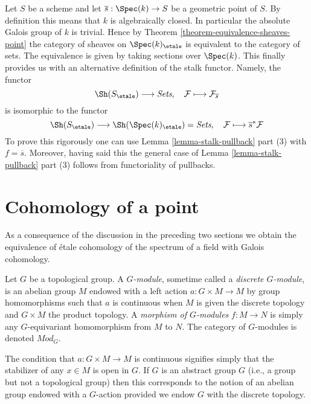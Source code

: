 \begin{remark}
\label{remark-stalk-pullback}
Let $S$ be a scheme and let $\overline{s} : \Spec(k) \to S$
be a geometric point of $S$. By definition this means that $k$
is algebraically closed. In particular the absolute Galois group of $k$
is trivial. Hence by
Theorem \ref{theorem-equivalence-sheaves-point}
the category of sheaves on $\Spec(k)_\etale$ is equivalent
to the category of sets. The equivalence is given by taking
sections over $\Spec(k)$. This finally provides us with an
alternative definition of the stalk functor. Namely, the functor
$$
\Sh(S_\etale) \longrightarrow \textit{Sets}, \quad
\mathcal{F} \longmapsto \mathcal{F}_{\overline{s}}
$$
is isomorphic to the functor
$$
\Sh(S_\etale)
\longrightarrow
\Sh(\Spec(k)_\etale) = \textit{Sets},
\quad
\mathcal{F} \longmapsto \overline{s}^*\mathcal{F}
$$
To prove this rigorously one can use
Lemma \ref{lemma-stalk-pullback} part (3)
with $f = \overline{s}$. Moreover, having said this the general case of
Lemma \ref{lemma-stalk-pullback} part (3)
follows from functoriality of pullbacks.
\end{remark}




\section{Cohomology of a point}
\label{section-cohomology-point}

\noindent
As a consequence of the discussion in the preceding two sections
we obtain the equivalence of \'etale cohomology of the spectrum of a
field with Galois cohomology.

\begin{definition}
\label{definition-G-module-continuous}
Let $G$ be a topological group.
A {\it $G$-module}, sometime called a {\it discrete $G$-module},
is an abelian group $M$ endowed with a left action $a : G \times M \to M$
by group homomorphisms such that $a$ is continuous when $M$ is given the
discrete topology and $G \times M$ the product topology.
A {\it morphism of $G$-modules} $f : M \to N$ is simply any $G$-equivariant
homomorphism from $M$ to $N$.
The category of $G$-modules is denoted {\it $\textit{Mod}_G$}.
\end{definition}

\noindent
The condition that $a : G \times M \to M$ is continuous signifies
simply that the stabilizer of any  $x \in M$ is open in $G$.
If $G$ is an abstract group $G$ (i.e., a group but not a topological group)
then this corresponds to the notion of an abelian group endowed with
a $G$-action provided we endow $G$ with the discrete topology.

